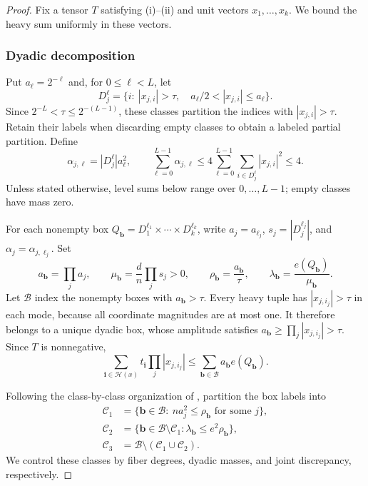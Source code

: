 \documentclass[11pt,reqno]{amsart}
\numberwithin{equation}{section}
\theoremstyle{definition}
\theoremstyle{remark}
\begin{document}
\begin{proof}
Fix a tensor $T$ satisfying \textup{(i)}--\textup{(ii)} and unit vectors
$x_1,\ldots,x_k$. We bound the heavy sum uniformly in these vectors.

\subsubsection*{Dyadic decomposition}
Put $a_\ell=2^{-\ell}$ and, for $0\le\ell<L$, let
\[
 D_j^\ell=\{i:\ |x_{j,i}|>\tau,\quad a_\ell/2<|x_{j,i}|\le a_\ell\}.
\]
Since $2^{-L}<\tau\le2^{-(L-1)}$, these classes partition the indices
with $|x_{j,i}|>\tau$. Retain their labels when discarding empty
classes to obtain a labeled partial partition. Define
\begin{equation}\label{eq:alpha}
 \alpha_{j,\ell}=|D_j^\ell|a_\ell^2,\qquad
 \sum_{\ell=0}^{L-1}\alpha_{j,\ell}
 \le4\sum_{\ell=0}^{L-1}\sum_{i\in D_j^\ell}|x_{j,i}|^2
 \le4.
\end{equation}
Unless stated otherwise, level sums below range over $0,\ldots,L-1$;
empty classes have mass zero.

For each nonempty box $Q_{\mathbf b}=D_1^{\ell_1}\times\cdots\times D_k^{\ell_k}$,
write $a_j=a_{\ell_j}$, $s_j=|D_j^{\ell_j}|$, and
$\alpha_j=\alpha_{j,\ell_j}$. Set
\begin{equation}\label{eq:box-parameters}
 a_{\mathbf b}=\prod_j a_j,\qquad
 \mu_{\mathbf b}=\frac dn\prod_j s_j>0,\qquad
 \rho_{\mathbf b}=\frac{a_{\mathbf b}}{\tau},\qquad
 \lambda_{\mathbf b}=\frac{e(Q_{\mathbf b})}{\mu_{\mathbf b}}.
\end{equation}
Let $\mathcal B$ index the nonempty boxes with $a_{\mathbf b}>\tau$.
Every heavy tuple has $|x_{j,i_j}|>\tau$ in each mode, because all
coordinate magnitudes are at most one. It therefore belongs to a
unique dyadic box, whose amplitude satisfies
$a_{\mathbf b}\ge\prod_j|x_{j,i_j}|>\tau$. Since $T$ is nonnegative,
\begin{equation}\label{eq:heavy-box-domination}
 \sum_{\mathbf i\in\mathcal H(x)}t_{\mathbf i}\prod_j|x_{j,i_j}|
 \le\sum_{\mathbf b\in\mathcal B}a_{\mathbf b}e(Q_{\mathbf b}).
\end{equation}

Following the class-by-class organization of \cite[Section~4.3]{ZZ21},
partition the box labels into
\begin{align*}
 \mathcal C_1
 &=\{\mathbf b\in\mathcal B:\ na_j^2\le\rho_{\mathbf b}
                                      \text{ for some }j\},\\
 \mathcal C_2
 &=\{\mathbf b\in\mathcal B\setminus\mathcal C_1:
                               \lambda_{\mathbf b}\le e^2\rho_{\mathbf b}\},\\
 \mathcal C_3&=\mathcal B\setminus(\mathcal C_1\cup\mathcal C_2).
\end{align*}
We control these classes by fiber degrees, dyadic masses, and joint
discrepancy, respectively.


\end{proof}
\end{document}
